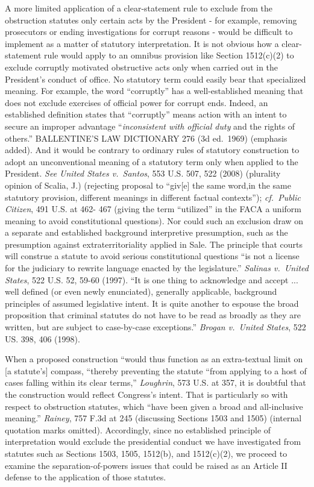 A more limited application of a clear-statement rule to exclude from the obstruction statutes only certain acts by the President - for example, removing prosecutors or ending investigations for corrupt reasons - would be difficult to implement as a matter of statutory interpretation.
It is not obvious how a clear-statement rule would apply to an omnibus provision like Section 1512(c)(2) to exclude corruptly motivated obstructive acts only when carried out in the President’s conduct of office.
No statutory term could easily bear that specialized meaning.
For example, the word “corruptly” has a well-established meaning that does not exclude exercises of official power for corrupt ends.
Indeed, an established definition states that “corruptly” means action with an intent to secure an improper advantage “\textit{inconsistent with official duty} and the rights of others.”
BALLENTINE’S LAW DICTIONARY 276 (3d ed.~1969) (emphasis added).
And it would be contrary to ordinary rules of statutory construction to adopt an unconventional meaning of a statutory term only when applied to the President.
\textit{See United States v.\ Santos}, 553 U.S. 507, 522 (2008) (plurality opinion of Scalia, J.) (rejecting proposal to “giv[e] the same word,in the same statutory provision, different meanings in different factual contexts”);
\textit{cf.~Public Citizen}, 491 U.S. at 462- 467 (giving the term “utilized” in the FACA a uniform meaning to avoid constitutional questions).
Nor could such an exclusion draw on a separate and established background interpretive presumption, such as the presumption against extraterritoriality applied in Sale.
The principle that courts will construe a statute to avoid serious constitutional questions “is not a license for the judiciary to rewrite language enacted by the legislature.”
\textit{Salinas v.\ United States}, 522 U.S. 52, 59-60 (1997).
“It is one thing to acknowledge and accept ... well defined (or even newly enunciated), generally applicable, background principles of assumed legislative intent.
It is quite another to espouse the broad proposition that criminal statutes do not have to be read as broadly as they are written, but are subject to case-by-case exceptions.”
\textit{Brogan v.\ United States}, 522 US. 398, 406 (1998).

When a proposed construction “would thus function as an extra-textual limit on [a statute’s] compass, “thereby preventing the statute “from applying to a host of cases falling within its clear terms,” \textit{Loughrin}, 573 U.S. at 357, it is doubtful that the construction would reflect Congress’s intent.
That is particularly so with respect to obstruction statutes, which “have been given a broad and all-inclusive meaning.”
\textit{Rainey}, 757 F.3d at 245 (discussing Sections 1503 and 1505) (internal quotation marks omitted).
Accordingly, since no established principle of interpretation would exclude the presidential conduct we have investigated from statutes such as Sections 1503, 1505, 1512(b), and 1512(c)(2), we proceed to examine the separation-of-powers issues that could be raised as an Article II defense to the application of those statutes.


